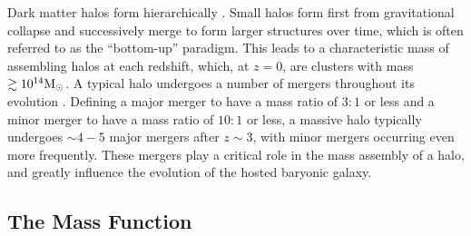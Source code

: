 Dark matter halos form hierarchically \citep[e.g.,][and references therein]{2000MNRAS.319..168C, 2003AJ....126.1183C}.  Small halos form first from gravitational collapse and successively merge to form larger structures over time, which is often referred to as the ``bottom-up'' paradigm.  This leads to a characteristic mass of assembling halos at each redshift, which, at $z = 0$, are clusters with mass $\gtrsim 10^{14} {\rm M_\odot}$.  A typical halo undergoes a number of mergers throughout its evolution \citep[e.g.,][]{2003AJ....126.1183C, 2009ApJ...701.2002G, 2010MNRAS.406.2267F}.  Defining a major merger to have a mass ratio of $3:1$ or less and a minor merger to have a mass ratio of $10:1$ or less, a massive halo typically undergoes $\sim 4-5$ major mergers after $z \sim 3$, with minor mergers occurring even more frequently.  These mergers play a critical role in the mass assembly of a halo, and greatly influence the evolution of the hosted baryonic galaxy.




\subsection{The Mass Function}
\label{subsec:early_universe--dark_matter_halos--mass}



